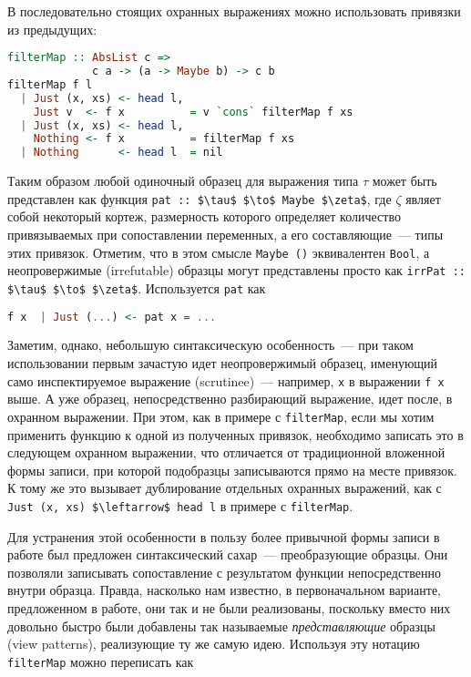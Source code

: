 В последовательно стоящих охранных выражениях можно использовать привязки из предыдущих:

\noindent
\begin{minipage}{\linewidth}
\begin{lstlisting}[language=haskell]
filterMap :: AbsList c => 
             c a -> (a -> Maybe b) -> c b
filterMap f l
  | Just (x, xs) <- head l, 
    Just v  <- f x          = v `cons` filterMap f xs
  | Just (x, xs) <- head l,
    Nothing <- f x          = filterMap f xs
  | Nothing      <- head l  = nil
\end{lstlisting}
\end{minipage}

Таким образом любой одиночный образец для выражения типа $ \tau $ может быть представлен как функция \lstinline[breaklines]|pat :: $\tau$ $\to$ Maybe $\zeta$|, где $ \zeta $ являет собой некоторый кортеж, размерность которого определяет количество привязываемых при сопоставлении переменных, а его составляющие~--- типы этих привязок. Отметим, что в этом смысле \lstinline[breaklines]|Maybe ()| эквивалентен \lstinline[breaklines]|Bool|, а неопровержимые (irrefutable) образцы могут представлены просто как \lstinline[breaklines]|irrPat :: $\tau$ $\to$ $\zeta$|. Используется \lstinline|pat| как

\noindent
\begin{minipage}{\linewidth}
\begin{lstlisting}[language=haskell]
f x  | Just (...) <- pat x = ...
\end{lstlisting}
\end{minipage}

Заметим, однако, небольшую синтаксическую особенность~--- при таком использовании первым зачастую идет неопровержимый образец, именующий само инспектируемое выражение (scrutinee)~--- например, \lstinline|x| в выражении \lstinline|f x| выше. А уже образец, непосредственно разбирающий выражение, идет после, в охранном выражении. При этом, как в примере с \lstinline|filterMap|, если мы хотим применить функцию к одной из полученных привязок, необходимо записать это в следующем охранном выражении, что отличается от традиционной вложенной формы записи, при которой подобразцы записываются прямо на месте привязок. К тому же это вызывает дублирование отдельных охранных выражений, как с \lstinline[breaklines]|Just (x, xs) $\leftarrow$ head l| в примере с \lstinline|filterMap|.

Для устранения этой особенности в пользу более привычной формы записи в работе был предложен синтаксический сахар~--- преобразующие образцы. Они позволяли записывать сопоставление с результатом функции непосредственно внутри образца. Правда, насколько нам известно, в первоначальном варианте, предложенном в работе, они так и не были реализованы, поскольку вместо них довольно быстро были добавлены так называемые \textit{представляющие} образцы (view patterns), реализующие ту же самую идею. Используя эту нотацию \lstinline|filterMap| можно переписать как 

